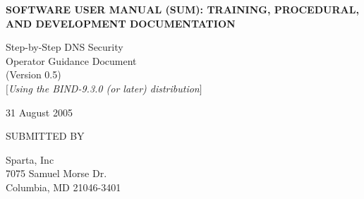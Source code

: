 \documentclass[12pt]{article}
\begin{document}

\begin{titlepage}

\vspace{.5in}

\begin{center}
\LARGE{\bf
SOFTWARE USER MANUAL (SUM):
TRAINING, PROCEDURAL, AND
DEVELOPMENT DOCUMENTATION
}
\vspace{.5in}

\Large{
Step-by-Step DNS Security\\
Operator Guidance Document\\
(Version 0.5)}\\
$[${\it Using the BIND-9.3.0 (or later) distribution}$]$
\vspace{0.5in}

% 
\vspace{2in}
31 August 2005
\end{center}

\vspace{.5in}

SUBMITTED BY

Sparta, Inc\\
7075 Samuel Morse Dr.\\
Columbia, MD 21046-3401
\vspace{0.25in}


\end{titlepage}

\end{document}

